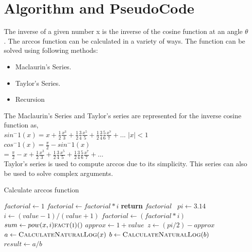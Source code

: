 \documentclass{article}
\begin{document}
    \section{Algorithm and PseudoCode}
    \noindent The inverse of a given number x is the inverse of the cosine function at an angle $\theta$. The arccos function can be calculated in a variety of ways. The function can be solved using following methods:
    \begin{itemize}
        \item Maclaurin's Series.
        \item Taylor's Series.
        \item Recursion
    \end{itemize}
    The Maclaurin's Series and Taylor's series are represented for the inverse cosine function as,
    \\[0.4 cm]
    $sin^-1(x) = x+\frac{1}{2} \frac{x^3}{3}+ \frac{1}{2} \frac{3}{4} \frac{x^5}{5}+\frac{1}{2}\frac{3}{4} \frac{5}{6} \frac{x^7}{7}+...$ $|x|<1$
    \\[0.4 cm]
    $cos^-1(x) = \frac{\pi}{2}- sin^-1(x)$
    \\[0.2 cm]
    = $\frac{\pi}{2}-  x+\frac{1}{2} \frac{x^3}{3}+ \frac{1}{2} \frac{3}{4} \frac{x^5}{5}+\frac{1}{2}\frac{3}{4} \frac{5}{6} \frac{x^7}{7}+...$\\[0.4 cm]
    Taylor's series is used to compute arccos due to its simplicity. This series can also be used to solve complex arguments.
    \begin{algorithm}
        \footnotesize
        \caption{Calculate arccos function}
        \begin{algorithmic}[1]
                \State $factorial \leftarrow 1$
                    \State $factorial \leftarrow factorial * i$
                \EndFor
                \State \textbf{return} $factorial$\
            \EndProcedure
            \Statex
                \State $pi \leftarrow 3.14$
                \State $i \leftarrow (value-1) / (value+1)$
                    \State $factorial \leftarrow (factorial * i)$
                    \State $sum \leftarrow pow(x,i) \Call{fact(i)} $
                \EndFor
                \State $approx\leftarrow 1+value$\
                \State $z\leftarrow (pi/2)-approx$
            \EndProcedure
            \Statex
            \State $ a \leftarrow \Call{CalculateNaturalLog}{x}$
            \State $ b \leftarrow \Call{CalculateNaturalLog}{b}$
            \State $result \leftarrow a/b $\Comment{Final result of $log_b x$}
        \end{algorithmic}
    \end{algorithm}
    \\[0.1 cm]
\end{document}

